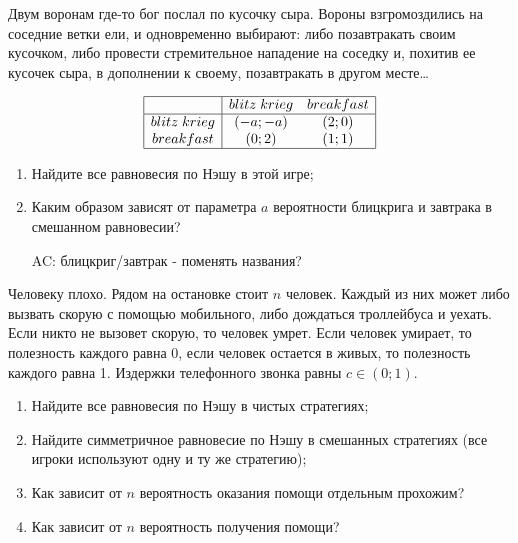 \begin{problem}
Двум воронам где-то бог послал по кусочку сыра. Вороны взгромоздились на соседние ветки ели, и одновременно выбирают: либо позавтракать своим кусочком, либо провести стремительное нападение на соседку и, похитив ее кусочек сыра, в дополнении к своему, позавтракать в другом месте\ldots \par
\[\begin{array}{|c|cc|}
\hline
{} & {blitz\; krieg} & {breakfast} \\
\hline
{blitz\; krieg} & {\left(-a;-a\right)} & {\left(2;0\right)} \\
{breakfast} & {\left(0;2\right)} & {\left(1;1\right)} \\
\hline
\end{array}\]
\begin{enumerate}
\item Найдите все равновесия по Нэшу в этой игре;\par
\item Каким образом зависят от параметра  $a$  вероятности блицкрига и завтрака в смешанном равновесии?\par
{\red  AC: блицкриг/завтрак - поменять названия?}
\end{enumerate}



\begin{sol}

\end{sol}
\end{problem}



\begin{problem}

Человеку плохо. Рядом на остановке стоит $n$  человек. Каждый из них может либо вызвать скорую с помощью мобильного, либо дождаться троллейбуса и уехать. Если никто не вызовет скорую, то человек умрет. Если человек умирает, то полезность каждого равна 0, если человек остается в живых, то полезность каждого равна 1. Издержки телефонного звонка равны  $c\in \left(0;1\right)$.\par
\begin{enumerate}
\item Найдите все равновесия по Нэшу в чистых стратегиях;\par
\item Найдите симметричное равновесие по Нэшу в смешанных стратегиях (все игроки используют одну и ту же стратегию);\par
\item  Как зависит от  $n$  вероятность оказания помощи отдельным прохожим?\par
\item Как зависит от  $n$  вероятность получения помощи?\par
\end{enumerate}



\begin{sol}

\end{sol}
\end{problem}



